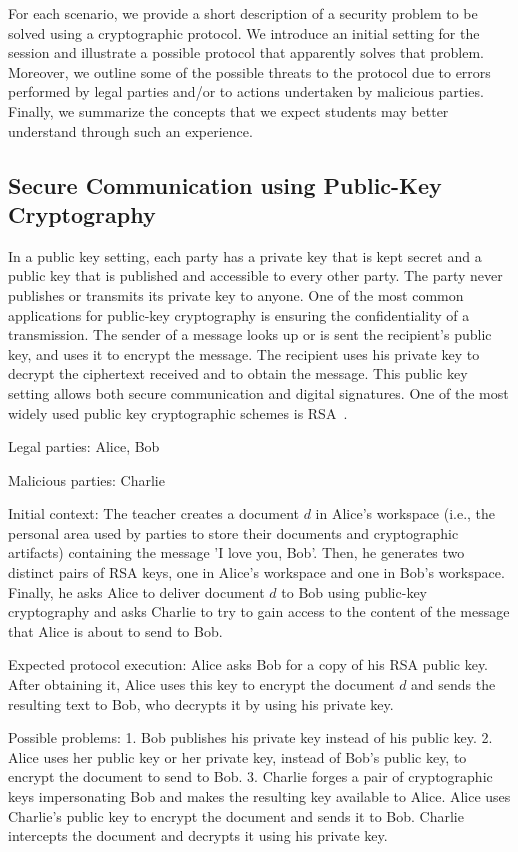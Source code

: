 \documentclass[10pt,conference]{IEEEtran}
\begin{document}
For each scenario, we provide a short description of a security
problem to be solved using a cryptographic protocol. We introduce an
initial setting for the session and illustrate a possible protocol
that apparently solves that problem. Moreover, we outline some of the
possible threats to the protocol due to errors performed by legal
parties and/or to actions undertaken by malicious parties. Finally, we
summarize the concepts that we expect students may better understand
through such an experience.

\subsection{ Secure Communication using Public-Key Cryptography}

In a public key setting, each party has a private key that is kept
secret and a public key that is published and accessible to every
other party. The party never publishes or transmits its private key to
anyone. One of the most common applications for public-key
cryptography is ensuring the confidentiality of a transmission. The
sender of a message looks up or is sent the recipient's public key,
and uses it to encrypt the message. The recipient uses his private
key to decrypt the ciphertext received and to obtain the message. 
This public key setting allows both secure communication and
digital signatures. One of the most widely used public key cryptographic schemes is RSA~\cite{rivest77}.

{\sc Legal parties:} Alice, Bob

{\sc Malicious parties:} Charlie

{\sc Initial context:} The teacher creates a document $d$ in Alice's
workspace (i.e., the personal area used by parties to store their
documents and cryptographic artifacts) containing the message 'I love you, Bob'. Then, he generates
two distinct pairs of RSA keys, one in Alice's workspace and one in
Bob's workspace. Finally, he asks Alice to deliver document $d$
to Bob using public-key cryptography and asks Charlie to try to
gain access to the content of the message that Alice is about to send to Bob.  

{\sc Expected protocol execution:} Alice asks Bob for a copy
of his RSA public key. After obtaining it, Alice uses this key
to encrypt the document $d$ and sends the resulting text to Bob, who decrypts it by using his private key.

{\sc Possible problems:} 1. Bob publishes his private key instead of
his public key. 2. Alice uses her public key or her private key,
instead of Bob's public key, to encrypt the document to send to Bob.
3. Charlie forges a pair of cryptographic keys impersonating Bob and
makes the resulting key available to Alice. Alice uses Charlie's
public key to encrypt the document and sends it to Bob. Charlie
intercepts the document and decrypts it using his private key.
\end{document}
